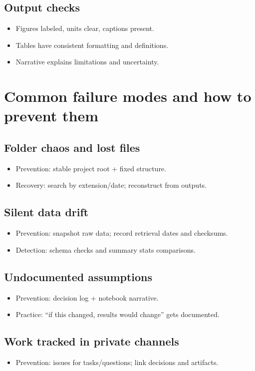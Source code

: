 \subsection{Output checks}
\begin{itemize}
\item Figures labeled, units clear, captions present.
\item Tables have consistent formatting and definitions.
\item Narrative explains limitations and uncertainty.
\end{itemize}

\section{Common failure modes and how to prevent them}
\subsection{Folder chaos and lost files}
\begin{itemize}
\item Prevention: stable project root + fixed structure.
\item Recovery: search by extension/date; reconstruct from outputs.
\end{itemize}

\subsection{Silent data drift}
\begin{itemize}
\item Prevention: snapshot raw data; record retrieval dates and checksums.
\item Detection: schema checks and summary stats comparisons.
\end{itemize}

\subsection{Undocumented assumptions}
\begin{itemize}
\item Prevention: decision log + notebook narrative.
\item Practice: ``if this changed, results would change'' gets documented.
\end{itemize}

\subsection{Work tracked in private channels}
\begin{itemize}
\item Prevention: issues for tasks/questions; link decisions and artifacts.
\end{itemize}

